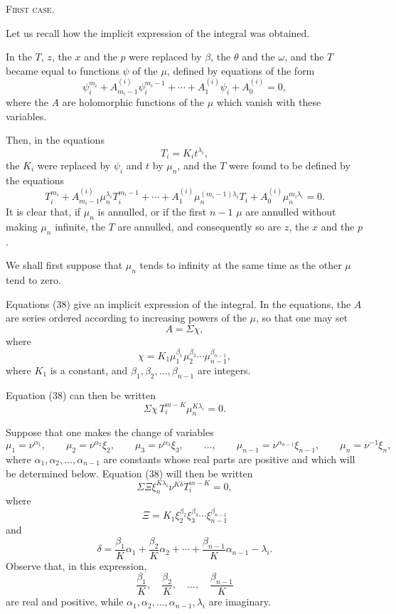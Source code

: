 \documentclass[11pt]{article}
\begin{document}
\begin{center}
{\scshape First case.}
\end{center}

Let us recall how the implicit expression of the integral was obtained.

In the $T$, $z$, the $x$ and the $p$ were replaced by $\beta$, the $\theta$ and the $\omega$, and the $T$ became equal to functions $\psi$ of the $\mu$, defined by equations of the form
\[
\psi_i^{m_i}+A_{m_i-1}^{(i)}\psi_i^{m_i-1}+\cdots+A_1^{(i)}\psi_i+A_0^{(i)}=0,
\]
where the $A$ are holomorphic functions of the $\mu$ which vanish with these variables.

Then, in the equations
\[
T_i=K_it^{\lambda_i},
\]
the $K_i$ were replaced by $\psi_i$ and $t$ by $\mu_n$, and the $T$ were found to be defined by the equations
\begin{equation*}\tag{38}
T_i^{m_i}+A_{m_i-1}^{(i)}\mu_n^{\lambda_i}T_i^{m_i-1}+\cdots+A_1^{(i)}\mu_n^{(m_i-1)\lambda_i}T_i+A_0^{(i)}\mu_n^{m_i\lambda_i}=0.
\end{equation*}
It is clear that, if $\mu_n$ is annulled, or if the first $n-1$ $\mu$ are annulled without making $\mu_n$ infinite, the $T$ are annulled, and consequently so are $z$, the $x$ and the $p$.

We shall first suppose that $\mu_n$ tends to infinity at the same time as the other $\mu$ tend to zero.

Equations (38) give an implicit expression of the integral.
In the equations, the $A$ are series ordered according to increasing powers of the $\mu$, so that one may set
\[
A=\Sigma\chi,
\]
where
\[
\chi=K_1\mu_1^{\beta_1}\mu_2^{\beta_2}\cdots\mu_{n-1}^{\beta_{n-1}},
\]
where $K_1$ is a constant, and $\beta_1,\beta_2,\ldots,\beta_{n-1}$ are integers.

Equation (38) can then be written
\[
\Sigma\chi\,T_i^{m-K}\mu_n^{K\lambda_i}=0.
\]

Suppose that one makes the change of variables
\begin{equation*}\tag{39}
\mu_1=\nu^{\alpha_1},\qquad
\mu_2=\nu^{\alpha_2}\xi_2,
\qquad
\mu_3=\nu^{\alpha_3}\xi_3,
\qquad \ldots,\qquad
\mu_{n-1}=\nu^{\alpha_{n-1}}\xi_{n-1},
\qquad
\mu_n=\nu^{-1}\xi_n,
\end{equation*}
where $\alpha_1,\alpha_2,\ldots,\alpha_{n-1}$ are constants whose real parts are positive and which will be determined below. Equation (38) will then be written
\[
\Sigma\Xi\xi_n^{K\lambda_i}\nu^{K\delta}T_i^{m-K}=0,
\]
where
\[
\Xi=K_1\xi_2^{\beta_2}\xi_3^{\beta_3}\cdots\xi_{n-1}^{\beta_{n-1}}
\]
and
\[
\delta=\frac{\beta_1}{K}\alpha_1+\frac{\beta_2}{K}\alpha_2+\cdots+\frac{\beta_{n-1}}{K}\alpha_{n-1}-\lambda_i.
\]
Observe that, in this expression,
\[
\frac{\beta_1}{K},\quad \frac{\beta_2}{K},\quad \ldots,\quad \frac{\beta_{n-1}}{K}
\]
are real and positive, while $\alpha_1,\alpha_2,\ldots,\alpha_{n-1},\lambda_i$ are imaginary.
\end{document}
